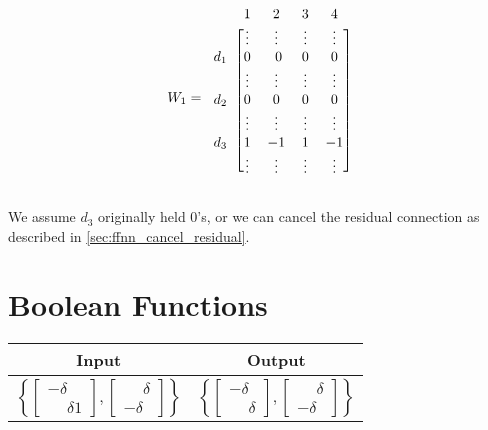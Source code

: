    \begin{equation*}
    W_1=
    \begin{blockarray}{ccccc}
        & 1& 2& 3&4 \\
        \begin{block}{c[cccc]}
                & \vdots &\vdots & \vdots & \vdots \\
                d_1 & 0 &\ 0 & 0 & 0 \\
                & \vdots &\vdots & \vdots & \vdots \\
                d_2 & 0 & 0 & 0 & 0 \\
                & \vdots &\vdots & \vdots & \vdots \\
                d_3 & 1  & -1 & 1 & -1 \\
                & \vdots &\vdots & \vdots & \vdots \\
        \end{block}
    \end{blockarray}
    \end{equation*}

    We assume $d_3$ originally held $0$'s, or we can cancel the residual connection as described in \cref{sec:ffnn_cancel_residual}.

\section{Boolean Functions}\label{sec:ffnn_boolean}

    \begin{tabular}{|c|c|}
        \hline
        \rowcolor{orange!20} %
        \textbf{Input} & \textbf{Output} \\
        \hline
        $\left\{\begin{bmatrix}
            -\delta\\\phantom- \delta1
        \end{bmatrix}, \begin{bmatrix}
            \phantom- \delta\\-\delta
        \end{bmatrix}\right\}$ & $\left\{\begin{bmatrix}
            -\delta\\\phantom- \delta
        \end{bmatrix}, \begin{bmatrix}
            \phantom- \delta\\-\delta
        \end{bmatrix}\right\}$ \\
        \hline
    \end{tabular}

